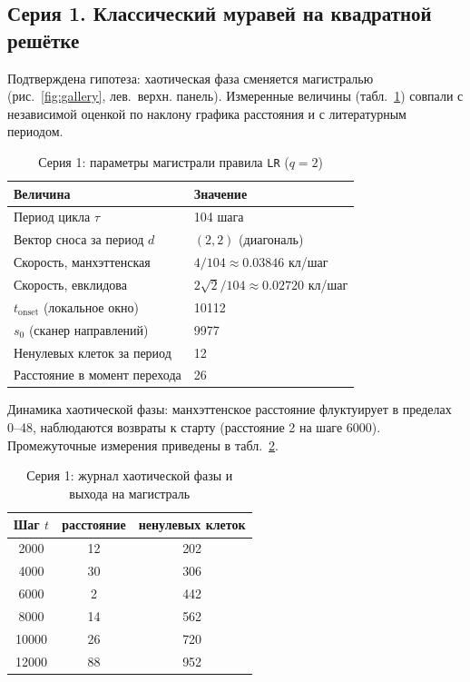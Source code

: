 \documentclass[12pt,a4paper]{article}
\begin{document}
	
	\subsection{Серия 1. Классический муравей на квадратной решётке}
	Подтверждена гипотеза: хаотическая фаза сменяется магистралью (рис.~\ref{fig:gallery}, лев.~верхн. панель). Измеренные величины (табл.~\ref{tab:series1}) совпали с независимой оценкой по наклону графика расстояния и с литературным периодом.
	
	\begin{table}[H]
		\centering
		\caption{Серия 1: параметры магистрали правила \texttt{LR} ($q=2$)}
		\label{tab:series1}
		\begin{tabular}{ll}
			\toprule
			Величина & Значение \\
			\midrule
			Период цикла $\tau$ & 104 шага \\
			Вектор сноса за период $d$ & $(2,2)$ (диагональ) \\
			Скорость, манхэттенская & $4/104 \approx 0.03846$ кл/шаг \\
			Скорость, евклидова & $2\sqrt2/104 \approx 0.02720$ кл/шаг \\
			$t_{\mathrm{onset}}$ (локальное окно) & 10112 \\
			$s_0$ (сканер направлений) & 9977 \\
			Ненулевых клеток за период & 12 \\
			Расстояние в момент перехода & 26 \\
			\bottomrule
		\end{tabular}
	\end{table}
	
	Динамика хаотической фазы: манхэттенское расстояние флуктуирует в пределах 0--48, наблюдаются возвраты к старту (расстояние 2 на шаге 6000). Промежуточные измерения приведены в табл.~\ref{tab:series1log}.
	
	\begin{table}[H]
		\centering
		\caption{Серия 1: журнал хаотической фазы и выхода на магистраль}
		\label{tab:series1log}
		\begin{tabular}{ccc}
			\toprule
			Шаг $t$ & расстояние & ненулевых клеток \\
			\midrule
			2000  & 12 & 202 \\
			4000  & 30 & 306 \\
			6000  & 2  & 442 \\
			8000  & 14 & 562 \\
			10000 & 26 & 720 \\
			12000 & 88 & 952 \\
			\bottomrule
		\end{tabular}
	\end{table}
	
\end{document}
